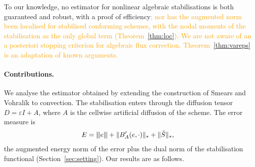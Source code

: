 \documentclass[11pt]{article}
\newcommand{\refe}[1]{\textcolor{orange}{#1}}   %
\newcommand{\tnorm}[1]{\lvert\kern-0.25ex\lvert\kern-0.25ex\lvert #1\rvert\kern-0.25ex\rvert\kern-0.25ex\rvert}
\newcommand{\eps}{\varepsilon}
\newcommand{\Stil}{\tilde S}
\theoremstyle{plain}
\theoremstyle{remark}
\numberwithin{equation}{section}
\begin{document}
To our knowledge, no estimator for nonlinear algebraic stabilisations is both guaranteed and robust,
with a proof of efficiency\refe{; nor has the augmented norm been localised for stabilised conforming
schemes, with the nodal moments of the stabilisation as the only global term (Theorem~\ref{thm:loc}).
We are not aware of an a posteriori stopping criterion for algebraic flux correction.
Theorem~\ref{thm:vareps} is an adaptation of known arguments.}

\paragraph{Contributions.}
We analyse the estimator obtained by extending the construction of Smears and Vohral\'ik \cite{SV20}
to convection. The stabilisation enters through the diffusion tensor $D=\eps I+A$, where $A$ is the
cellwise artificial diffusion of the scheme. The error measure is
\[
  E=\tnorm{e}+\|B_A'(e,\cdot)\|_*+\|\Stil\|_*,
\]
the augmented energy norm of the error plus the dual norm of the stabilisation functional
(Section~\ref{sec:setting}). Our results are as follows.
\end{document}
